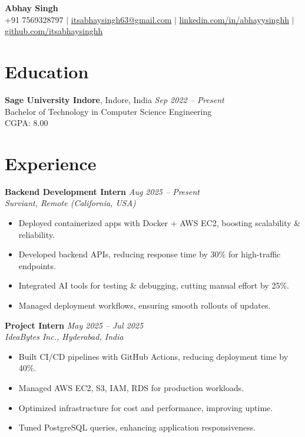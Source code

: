 \documentclass[a4paper,9pt]{article}
\begin{document}
\begin{center}
    {\LARGE \textbf{Abhay Singh}} \\[3pt]
    +91 7569328797 $|$ 
    \href{mailto:itsabhaysingh63@gmail.com}{itsabhaysingh63@gmail.com} $|$
    \href{https://linkedin.com/in/abhayysinghh}{linkedin.com/in/abhayysinghh} $|$
    \href{https://github.com/itsabhaysinghh}{github.com/itsabhaysinghh}
\end{center}

\section*{Education}
\textbf{Sage University Indore}, Indore, India \hfill \textit{Sep 2022 -- Present} \\
Bachelor of Technology in Computer Science Engineering \\
CGPA: 8.00

\section*{Experience}

\textbf{Backend Development Intern} \hfill \textit{Aug 2025 -- Present} \\
\textit{Surviant, Remote (California, USA)}
\begin{itemize}
    \item Deployed containerized apps with Docker + AWS EC2, boosting scalability \& reliability.
    \item Developed backend APIs, reducing response time by 30\% for high-traffic endpoints.
    \item Integrated AI tools for testing \& debugging, cutting manual effort by 25\%.
    \item Managed deployment workflows, ensuring smooth rollouts of updates.
\end{itemize}

\textbf{Project Intern} \hfill \textit{May 2025 -- Jul 2025} \\
\textit{IdeaBytes Inc., Hyderabad, India}
\begin{itemize}
    \item Built CI/CD pipelines with GitHub Actions, reducing deployment time by 40\%.
    \item Managed AWS EC2, S3, IAM, RDS for production workloads.
    \item Optimized infrastructure for cost and performance, improving uptime.
    \item Tuned PostgreSQL queries, enhancing application responsiveness.
\end{itemize}
\end{document}
